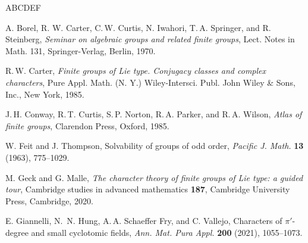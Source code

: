 \documentclass[12pt]{amsart}
\theoremstyle{definition}
\numberwithin{equation}{section}
\begin{document}
\begin{thebibliography}{ABCDEF}

A. Borel, R. W. Carter, C.\,W. Curtis, N. Iwahori, T.\,A. Springer,
and R. Steinberg, \emph{Seminar on algebraic groups and related
finite groups}, Lect. Notes in Math. 131, Springer-Verlag, Berlin,
1970.

R.\,W. Carter, \emph{Finite groups of Lie type. Conjugacy classes
and complex characters}, Pure Appl. Math. (N. Y.) Wiley-Intersci.
Publ. John Wiley \& Sons, Inc., New York, 1985.

  J.\,H. Conway, R.\,T. Curtis, S.\,P. Norton, R.\,A. Parker, and R.\,A. Wilson,
 {\it Atlas of finite groups}, Clarendon Press, Oxford, 1985.


W. Feit and J. Thompson, Solvability of groups of odd order,
\emph{Pacific J. Math.} \textbf{13} (1963), 775--1029.





M. Geck and G. Malle, {\it The character theory of finite groups of
Lie type: a guided tour}, Cambridge studies in advanced mathematics
\textbf{187}, Cambridge University Press, Cambridge, 2020.

E. Giannelli, N.%
\,N. Hung, %
A.\,A. Schaeffer Fry, %
and %
C. Vallejo,
Characters %
of $\pi'$-degree and small cyclotomic fields, \emph{Ann.
Mat. Pura Appl.} \textbf{200} (2021), 1055--1073.


\end{thebibliography}
\end{document}
